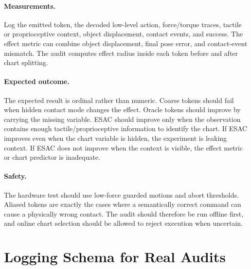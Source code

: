 \documentclass{article}
\begin{document}
\paragraph{Measurements.}
Log the emitted token, the decoded low-level action, force/torque traces,
tactile or proprioceptive context, object displacement, contact events, and
success. The effect metric can combine object displacement, final pose error,
and contact-event mismatch. The audit computes effect radius inside each token
before and after chart splitting.

\paragraph{Expected outcome.}
The expected result is ordinal rather than numeric. Coarse tokens should fail
when hidden contact mode changes the effect. Oracle tokens should improve by
carrying the missing variable. ESAC should improve only when the observation
contains enough tactile/proprioceptive information to identify the chart. If
ESAC improves even when the chart variable is hidden, the experiment is leaking
context. If ESAC does not improve when the context is visible, the effect metric
or chart predictor is inadequate.

\paragraph{Safety.}
The hardware test should use low-force guarded motions and abort thresholds.
Aliased tokens are exactly the cases where a semantically correct command can
cause a physically wrong contact. The audit should therefore be run offline
first, and online chart selection should be allowed to reject execution when
uncertain.

\section{Logging Schema for Real Audits}
\end{document}
